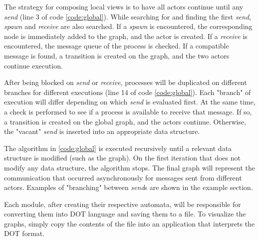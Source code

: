 The strategy for composing local views is to have all actors continue until any \textit{send} (line 3 of code \ref{code:global}). While searching for and finding the first \textit{send}, \textit{spawn} and \textit{receive} are also searched. If a \textit{spawn} is encountered, the corresponding node is immediately added to the graph, and the actor is created. If a \textit{receive} is encountered, the message queue of the process is checked. If a compatible message is found, a transition is created on the graph, and the two actors continue execution.

After being blocked on \textit{send} or \textit{receive}, processes will be duplicated on different branches for different executions (line 14 of code \ref{code:global}). Each "branch" of execution will differ depending on which \textit{send} is evaluated first. At the same time, a check is performed to see if a process is available to receive that message. If so, a transition is created on the global graph, and the actors continue. Otherwise, the "vacant" \textit{send} is inserted into an appropriate data structure.

The algorithm in \ref{code:global} is executed recursively until a relevant data structure is modified (such as the graph). On the first iteration that does not modify any data structure, the algorithm stops. The final graph will represent the communication that occurred asynchronously for messages sent from different actors. Examples of "branching" between \textit{send}s are shown in the example section.

Each module, after creating their respective automata, will be responsible for converting them into DOT language and saving them to a file. To visualize the graphs, simply copy the contents of the file into an application that interprets the DOT format.
